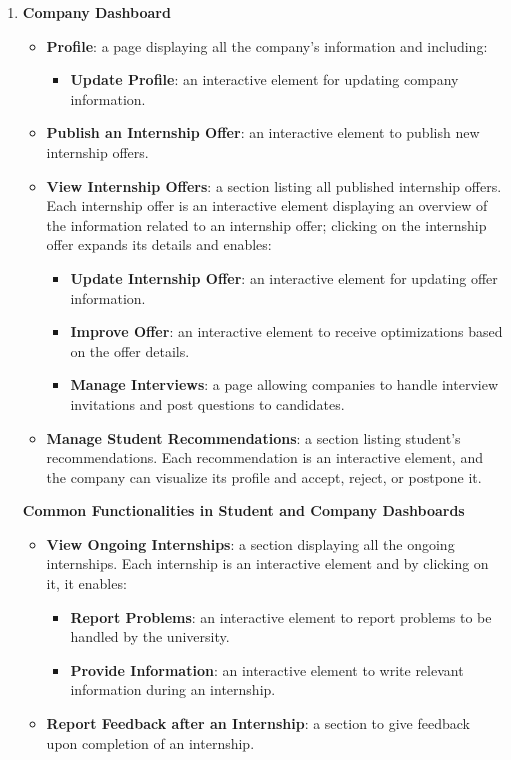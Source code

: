 \begin{enumerate}
    \item \textbf{Company Dashboard}
    \begin{itemize}
        \item \textbf{Profile}: a page displaying all the company's information and including:
        \begin{itemize}
            \item \textbf{Update Profile}: an interactive element for updating company information.
        \end{itemize}        
        \item \textbf{Publish an Internship Offer}: an interactive element to publish new internship offers.
        \item \textbf{View Internship Offers}: a section listing all published internship offers. Each internship offer is an interactive element displaying an overview of the information related to an internship offer; clicking on the internship offer expands its details and enables:
        \begin{itemize}
            \item \textbf{Update Internship Offer}: an interactive element for updating offer information.
            \item \textbf{Improve Offer}: an interactive element to receive optimizations based on the offer details.
            \item \textbf{Manage Interviews}: a page allowing companies to handle interview invitations and post questions to candidates.
            \end{itemize}
        \item \textbf{Manage Student Recommendations}: a section listing student's recommendations. Each recommendation is an interactive element, and the company can visualize its profile and accept, reject, or postpone it.
    \end{itemize}

    \textbf{Common Functionalities in Student and Company Dashboards}
    \begin{itemize}
        \item \textbf{View Ongoing Internships}: a section displaying all the ongoing internships. Each internship is an interactive element and by clicking on it, it enables:
        \begin{itemize}
            \item \textbf{Report Problems}: an interactive element to report problems to be handled by the university.
            \item \textbf{Provide Information}: an interactive element to write relevant information during an internship.
        \end{itemize}
        \item \textbf{Report Feedback after an Internship}:  a section to give feedback upon completion of an internship.
    \end{itemize}


\end{enumerate}
